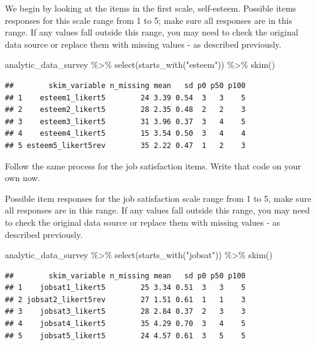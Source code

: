 \documentclass[
]{krantz}
\makeatletter
\newenvironment{Shaded}{\begin{snugshade}}{\end{snugshade}}
\newcommand{\FunctionTok}[1]{\textcolor[rgb]{0,0,0}{#1}}
\newcommand{\NormalTok}[1]{#1}
\newcommand{\SpecialCharTok}[1]{\textcolor[rgb]{0,0,0}{#1}}
\newcommand{\StringTok}[1]{\textcolor[rgb]{0.5,0.5,0.5}{#1}}
\newenvironment{kframe}{%
\medskip{}
\setlength{\fboxsep}{.8em}
 \def\at@end@of@kframe{}%
 \ifinner\ifhmode%
  \def\at@end@of@kframe{\end{minipage}}%
  \begin{minipage}{\columnwidth}%
 \fi\fi%
 \def\FrameCommand##1{\hskip\@totalleftmargin \hskip-\fboxsep
 \colorbox{shadecolor}{##1}\hskip-\fboxsep
     \hskip-\linewidth \hskip-\@totalleftmargin \hskip\columnwidth}%
 \MakeFramed {\advance\hsize-\width
   \@totalleftmargin\z@ \linewidth\hsize
   \@setminipage}}%
 {\par\unskip\endMakeFramed%
 \at@end@of@kframe}
\renewenvironment{Shaded}{\begin{kframe}}{\end{kframe}}
\makeatother
\begin{document}
We begin by looking at the items in the first scale, self-esteem. Possible items responses for this scale range from 1 to 5; make sure all responses are in this range. If any values fall outside this range, you may need to check the original data source or replace them with missing values - as described previously.

\begin{Shaded}
\begin{Highlighting}[]
\NormalTok{analytic\_data\_survey }\SpecialCharTok{\%\textgreater{}\%}
  \FunctionTok{select}\NormalTok{(}\FunctionTok{starts\_with}\NormalTok{(}\StringTok{"esteem"}\NormalTok{)) }\SpecialCharTok{\%\textgreater{}\%}
  \FunctionTok{skim}\NormalTok{()}
\end{Highlighting}
\end{Shaded}

\begin{verbatim}
##        skim_variable n_missing mean   sd p0 p50 p100
## 1    esteem1_likert5        24 3.39 0.54  3   3    5
## 2    esteem2_likert5        28 2.35 0.48  2   2    3
## 3    esteem3_likert5        31 3.96 0.37  3   4    5
## 4    esteem4_likert5        15 3.54 0.50  3   4    4
## 5 esteem5_likert5rev        35 2.22 0.47  1   2    3
\end{verbatim}

Follow the same process for the job satisfaction items. Write that code on your own now.

Possible item responses for the job satisfaction scale range from 1 to 5, make sure all responses are in this range. If any values fall outside this range, you may need to check the original data source or replace them with missing values - as described previously.

\begin{Shaded}
\begin{Highlighting}[]
\NormalTok{analytic\_data\_survey }\SpecialCharTok{\%\textgreater{}\%}
  \FunctionTok{select}\NormalTok{(}\FunctionTok{starts\_with}\NormalTok{(}\StringTok{"jobsat"}\NormalTok{)) }\SpecialCharTok{\%\textgreater{}\%}
  \FunctionTok{skim}\NormalTok{()}
\end{Highlighting}
\end{Shaded}

\begin{verbatim}
##        skim_variable n_missing mean   sd p0 p50 p100
## 1    jobsat1_likert5        25 3.34 0.51  3   3    5
## 2 jobsat2_likert5rev        27 1.51 0.61  1   1    3
## 3    jobsat3_likert5        28 2.84 0.37  2   3    3
## 4    jobsat4_likert5        35 4.29 0.70  3   4    5
## 5    jobsat5_likert5        24 4.57 0.61  3   5    5
\end{verbatim}
\end{document}
